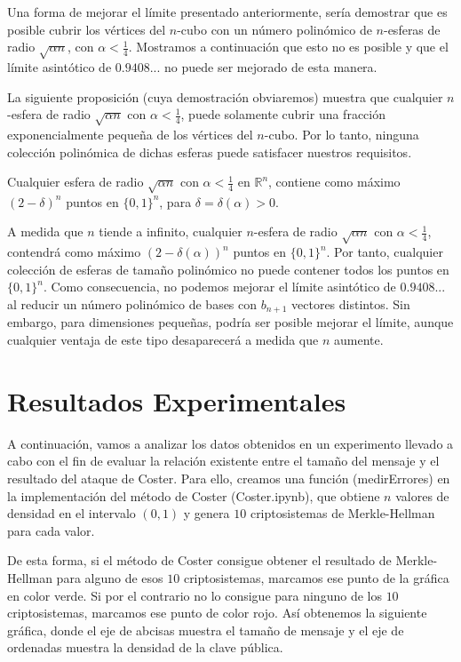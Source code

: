     Una forma de mejorar el límite presentado anteriormente, sería demostrar que es posible cubrir los vértices del $n$-cubo con un número polinómico de $n$-esferas de radio $\sqrt{\alpha n}$, con $\alpha < \frac{1}{4}$. Mostramos a continuación que esto no es posible y que el límite asintótico de $0.9408...$ no puede ser mejorado de esta manera. 
    
    La siguiente proposición (cuya demostración obviaremos) muestra que cualquier $n$-esfera de radio $\sqrt{\alpha n}$ con $\alpha < \frac{1}{4}$, puede solamente cubrir una fracción exponencialmente pequeña de los vértices del $n$-cubo. Por lo tanto, ninguna colección polinómica de dichas esferas puede satisfacer nuestros requisitos.

    \begin{proposicion} \cite{artCoster}
        Cualquier esfera de radio $\sqrt{\alpha n}$ con $\alpha < \frac{1}{4}$ en $\mathbb{R}^{n}$, contiene como máximo $(2-\delta)^{n}$ puntos en $\{0, 1\}^{n}$, para $\delta = \delta(\alpha) > 0$.
    \end{proposicion}

    A medida que $n$ tiende a infinito, cualquier $n$-esfera de radio $\sqrt{\alpha n}$ con $\alpha < \frac{1}{4}$, contendrá como máximo $(2-\delta(\alpha))^{n}$ puntos en $\{0, 1\}^{n}$. Por tanto, cualquier colección de esferas de tamaño polinómico no puede contener todos los puntos en $\{0, 1\}^{n}$. Como consecuencia, no podemos mejorar el límite asintótico de $0.9408...$ al reducir un número polinómico de bases con $b_{n+1}$ vectores distintos. Sin embargo, para dimensiones pequeñas, podría ser posible mejorar el límite, aunque cualquier ventaja de este tipo desaparecerá a medida que $n$ aumente.

    \section{Resultados Experimentales}
    
    A continuación, vamos a analizar los datos obtenidos en un experimento llevado a cabo con el fin de evaluar la relación existente entre el tamaño del mensaje y el resultado del ataque de Coster. Para ello, creamos una función (medirErrores) en la implementación del método de Coster (Coster.ipynb), que obtiene $n$ valores de densidad en el intervalo $(0, 1)$ y genera $10$ criptosistemas de Merkle-Hellman para cada valor.

    De esta forma, si el método de Coster consigue obtener el resultado de Merkle-Hellman para alguno de esos $10$ criptosistemas, marcamos ese punto de la gráfica en color verde. Si por el contrario no lo consigue para ninguno de los $10$ criptosistemas, marcamos ese punto de color rojo. Así obtenemos la siguiente gráfica, donde el eje de abcisas muestra el tamaño de mensaje y el eje de ordenadas muestra la densidad de la clave pública.
    
